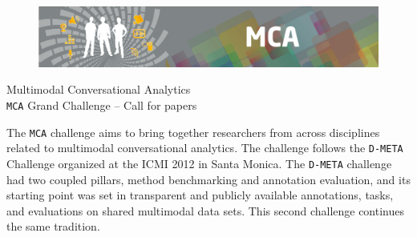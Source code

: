 \documentclass[a4paper]{article}
\begin{document}
\begin{figure}
\vspace{-3.3cm}
\hspace{-2.2cm}
\includegraphics[width=1.25\textwidth]{BannerMCA.jpg}\vspace{0.2cm}\\
\end{figure}


\begin{center}
{\LARGE
Multimodal Conversational Analytics \vspace{0.3cm}\\
\texttt{MCA} Grand Challenge -- Call for papers
} 
\end{center}
\vspace{0.5cm}

\begin{center}
\begin{minipage}{0.92\textwidth}
{\small
The \texttt{MCA} challenge aims to bring together researchers from across disciplines related to multimodal
conversational analytics. The challenge follows the \texttt{D-META} Challenge organized at the ICMI 2012 in Santa
Monica. The \texttt{D-META} challenge had two coupled pillars, method benchmarking and annotation evaluation, and its
starting point was set in transparent and publicly available annotations, tasks, and evaluations on shared multimodal
data sets. This second challenge continues the same tradition.}
\end{minipage}
\end{center}
\vspace{0.5cm}


\begin{center}
\end{center}
\end{document}
